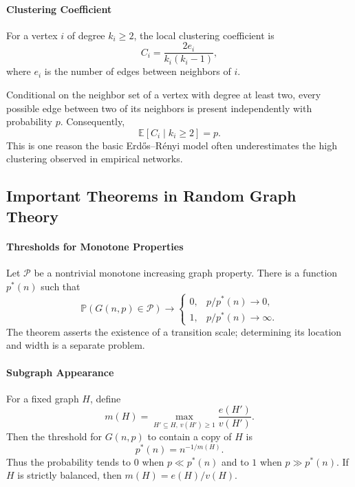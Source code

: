 \paragraph{Clustering Coefficient}
\begin{definition}
For a vertex $i$ of degree $k_i\ge2$, the local clustering coefficient is
\[
C_i = \frac{2e_i}{k_i(k_i-1)},
\]
where $e_i$ is the number of edges between neighbors of $i$.
\end{definition}

\begin{proposition}[Clustering in $G(n,p)$]
Conditional on the neighbor set of a vertex with degree at least two, every possible edge between two of its neighbors is present independently with probability $p$. Consequently,
\[
    \mathbb{E}[C_i\mid k_i\ge2]=p.
\]
This is one reason the basic Erdős--Rényi model often underestimates the high clustering observed in empirical networks.
\end{proposition}

\subsection{Important Theorems in Random Graph Theory}

\paragraph{Thresholds for Monotone Properties}
\begin{theorem}
Let $\mathcal{P}$ be a nontrivial monotone increasing graph property. There is a function $p^*(n)$ such that
\[
\mathbb{P}(G(n,p)\in\mathcal{P})\longrightarrow
\begin{cases}
0, & p/p^*(n)\to0,\\
1, & p/p^*(n)\to\infty.
\end{cases}
\]
The theorem asserts the existence of a transition scale; determining its location and width is a separate problem.
\end{theorem}

\paragraph{Subgraph Appearance}
\begin{theorem}
For a fixed graph $H$, define
\[
    m(H)=\max_{H'\subseteq H,\,v(H')\ge1}\frac{e(H')}{v(H')}.
\]
Then the threshold for $G(n,p)$ to contain a copy of $H$ is
\[
    p^*(n)=n^{-1/m(H)}.
\]
Thus the probability tends to $0$ when $p\ll p^*(n)$ and to $1$ when $p\gg p^*(n)$. If $H$ is strictly balanced, then $m(H)=e(H)/v(H)$.
\end{theorem}

